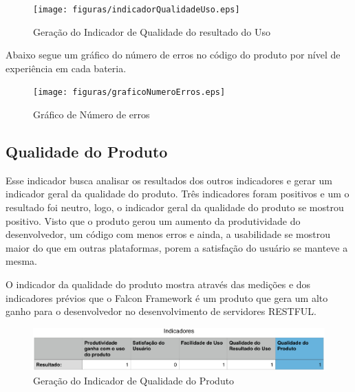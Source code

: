 \begin{figure}[H]
  \centering
  \label{fig:indicador4}
  \texttt{[image: figuras/indicadorQualidadeUso.eps]}
  \caption{Geração do Indicador de Qualidade do resultado do Uso}
\end{figure}

Abaixo segue um gráfico do número de erros no código do produto por nível de experiência em cada bateria.

\begin{figure}[H]
  \centering
  \label{fig:graficoIndicador4}
  \texttt{[image: figuras/graficoNumeroErros.eps]}
  \caption{Gráfico de Número de erros}
\end{figure}

\subsection{Qualidade do Produto}

Esse indicador busca analisar os resultados dos outros indicadores e gerar um indicador geral da qualidade do produto.
Três indicadores foram positivos e um o resultado foi neutro, logo, o indicador geral da qualidade do produto se mostrou
positivo. Visto que o produto gerou um aumento da produtividade do desenvolvedor, um código com menos erros e ainda, a
usabilidade se mostrou maior do que em outras plataformas, porem a satisfação do usuário se manteve a mesma.

O indicador da qualidade do produto mostra através das medições e dos indicadores prévios que o Falcon Framework é um
produto que gera um alto ganho para o desenvolvedor no desenvolvimento de servidores RESTFUL.

\begin{figure}[H]
  \centering
  \label{fig:indicador5}
  \includegraphics[keepaspectratio=true,scale=0.4]{figuras/indicadorQualidade.eps}
  \caption{Geração do Indicador de Qualidade do Produto}
\end{figure}
